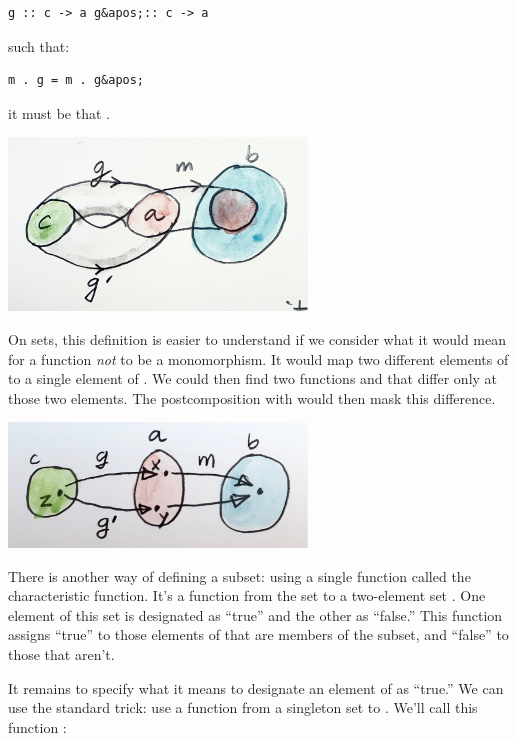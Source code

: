 \begin{verbatim}
g :: c -> a g&apos;:: c -> a
\end{verbatim}

such that:

\begin{verbatim}
m . g = m . g&apos;
\end{verbatim}

it must be that .

\includegraphics[width=3.12500in]{images/monomorphism.jpg}

On sets, this definition is easier to understand if we consider what it
would mean for a function  \emph{not} to be a monomorphism. It
would map two different elements of  to a single element of
. We could then find two functions  and
 that differ only at those two elements. The
postcomposition with  would then mask this difference.

\includegraphics[width=3.12500in]{images/notmono.jpg}

There is another way of defining a subset: using a single function
called the characteristic function. It's a function  from the
set  to a two-element set . One element of this set
is designated as ``true'' and the other as ``false.'' This function
assigns ``true'' to those elements of  that are members of the
subset, and ``false'' to those that aren't.

It remains to specify what it means to designate an element of
 as ``true.'' We can use the standard trick: use a function
from a singleton set to . We'll call this function
:


